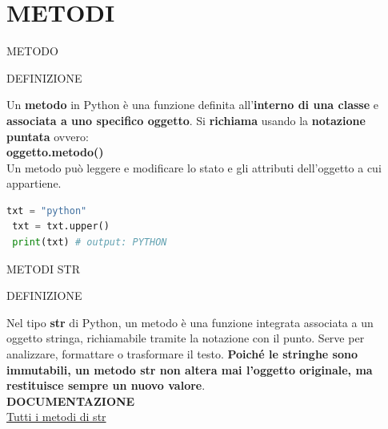 \documentclass[aspectratio=1610]{beamer}
\begin{document}
\section{METODI}

\begin{frame}[fragile]{METODO}
    \begin{alertblock}{DEFINIZIONE}
        \begin{minipage}{0.98\linewidth}
            \justifying
            Un \textbf{metodo} in Python è una funzione definita 
            all'\textbf{interno di una classe} e \textbf{associata a uno specifico 
            oggetto}. Si \textbf{richiama} usando la \textbf{notazione puntata} ovvero:\\ 
            \bigskip
            \textbf{oggetto.metodo()}\\
            \bigskip
            Un metodo può leggere e modificare lo stato e gli attributi 
            dell'oggetto a cui appartiene.\\
            \bigskip
\begin{lstlisting}[language=Python]
 txt = "python"
 txt = txt.upper()
 print(txt) # output: PYTHON
\end{lstlisting}
        \end{minipage}
    \end{alertblock}
\end{frame}

\begin{frame}{METODI STR}
    \begin{alertblock}{DEFINIZIONE}
        \begin{minipage}{0.98\linewidth}
            \justifying
            Nel tipo \textbf{str} di Python, un metodo è una funzione integrata associata 
            a un oggetto stringa, richiamabile tramite la notazione con il punto. Serve per 
            analizzare, formattare o trasformare il testo. \textbf{Poiché le stringhe sono immutabili, 
            un metodo str non altera mai l'oggetto originale, ma restituisce sempre un nuovo valore}.\\
            \bigskip
            \tiny{\textbf{DOCUMENTAZIONE}}\\
            \tiny{\href{https://docs.python.org/it/3.14/builtins/stdtypes.html\#text-and-binary-sequence-type-methods-summary}{Tutti i metodi di str}}
        \end{minipage}
    \end{alertblock}
\end{frame}
\end{document}
